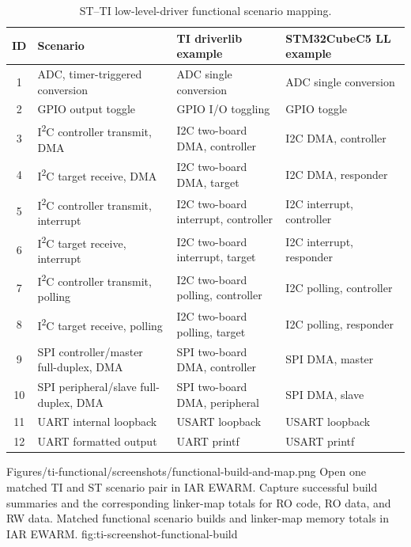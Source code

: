\begin{table}[H]
\centering
\small
\caption{ST--TI low-level-driver functional scenario mapping.}
\label{tab:ti-functional-scenarios}
\begin{tabularx}{\textwidth}{c l X X}
\toprule
\textbf{ID} & \textbf{Scenario} & \textbf{TI driverlib example} & \textbf{STM32CubeC5 LL example} \\
\midrule
1 & ADC, timer-triggered conversion & ADC single conversion & ADC single conversion \\
2 & GPIO output toggle & GPIO I/O toggling & GPIO toggle \\
3 & I\textsuperscript{2}C controller transmit, DMA & I2C two-board DMA, controller & I2C DMA, controller \\
4 & I\textsuperscript{2}C target receive, DMA & I2C two-board DMA, target & I2C DMA, responder \\
5 & I\textsuperscript{2}C controller transmit, interrupt & I2C two-board interrupt, controller & I2C interrupt, controller \\
6 & I\textsuperscript{2}C target receive, interrupt & I2C two-board interrupt, target & I2C interrupt, responder \\
7 & I\textsuperscript{2}C controller transmit, polling & I2C two-board polling, controller & I2C polling, controller \\
8 & I\textsuperscript{2}C target receive, polling & I2C two-board polling, target & I2C polling, responder \\
9 & SPI controller/master full-duplex, DMA & SPI two-board DMA, controller & SPI DMA, master \\
10 & SPI peripheral/slave full-duplex, DMA & SPI two-board DMA, peripheral & SPI DMA, slave \\
11 & UART internal loopback & USART loopback & USART loopback \\
12 & UART formatted output & UART printf & USART printf \\
\bottomrule
\end{tabularx}
\end{table}

\reportscreenshot
      {Figures/ti-functional/screenshots/functional-build-and-map.png}
      {Open one matched TI and ST scenario pair in IAR EWARM. Capture successful build summaries and the corresponding linker-map totals for RO code, RO data, and RW data.}
      {Matched functional scenario builds and linker-map memory totals in IAR EWARM.}
      {fig:ti-screenshot-functional-build}

